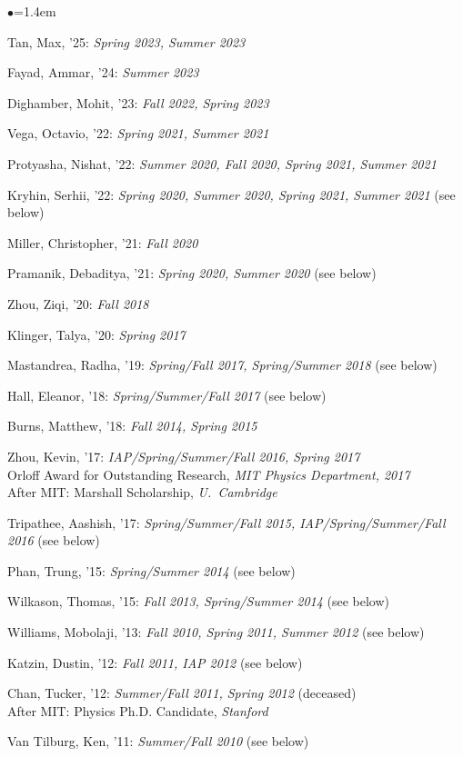 \documentclass[11pt]{article}
\newcommand{\sh}{\phantom{.....}}
\newcommand{\bbl}{\begin{list}{$\bullet$}{\leftmargin=1.4em \itemsep=-1pt}}
\newcommand{\el}{\end{list}}
\begin{document}
\bbl
\item Tan, Max, '25: \textit{Spring 2023, Summer 2023}
\item Fayad, Ammar, '24: \textit{Summer 2023}
\item Dighamber, Mohit, '23: \textit{Fall 2022, Spring 2023}
\item Vega, Octavio, '22:  \textit{Spring 2021, Summer 2021}
\item Protyasha, Nishat, '22:  \textit{Summer 2020, Fall 2020, Spring 2021, Summer 2021}
\item Kryhin, Serhii, '22:   \textit{Spring 2020, Summer 2020, Spring 2021, Summer 2021} (see below)
\item Miller, Christopher, '21:  \textit{Fall 2020}
\item Pramanik, Debaditya, '21:  \textit{Spring 2020, Summer 2020} (see below)
\item Zhou, Ziqi, '20:  \textit{Fall 2018}
\item Klinger, Talya, '20:  \textit{Spring 2017}
\item Mastandrea, Radha, '19:  \textit{Spring/Fall 2017, Spring/Summer 2018} (see below)
\item Hall, Eleanor, '18:  \textit{Spring/Summer/Fall 2017} (see below)
\item Burns, Matthew, '18:  \textit{Fall 2014, Spring 2015}
\item Zhou, Kevin, '17:  \textit{IAP/Spring/Summer/Fall 2016, Spring 2017}
\\ \sh Orloff Award for Outstanding Research, \textit{MIT Physics Department, 2017}
\\ \sh After MIT:  Marshall Scholarship, \textit{U.~Cambridge}
\item Tripathee, Aashish, '17: \textit{Spring/Summer/Fall 2015, IAP/Spring/Summer/Fall 2016} (see below)
\item Phan, Trung, '15: \textit{Spring/Summer 2014} (see below)
\item Wilkason, Thomas, '15: \textit{Fall 2013, Spring/Summer 2014} (see below)
\item Williams, Mobolaji, '13: \textit{Fall 2010, Spring 2011, Summer 2012} (see below)
\item Katzin, Dustin, '12: \textit{Fall 2011, IAP 2012} (see below)
\item Chan, Tucker, '12: \textit{Summer/Fall 2011, Spring 2012}  (deceased)
\\ \sh After MIT:   Physics Ph.D. Candidate, \textit{Stanford}
\item Van Tilburg, Ken, '11:  \textit{Summer/Fall 2010} (see below)
\el
\end{document}
